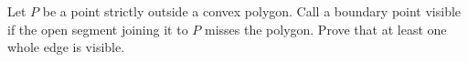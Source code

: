 Let $P$ be a point strictly outside a convex polygon. Call a boundary point visible if the open segment joining it to $P$ misses the polygon. Prove that at least one whole edge is visible.
